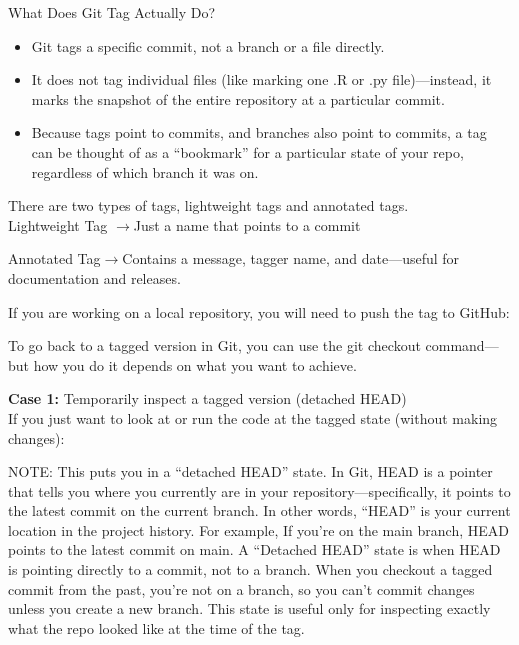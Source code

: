 \noindent What Does Git Tag Actually Do?
\begin{itemize}
\item Git tags a specific commit, not a branch or a file directly.
\item It does not tag individual files (like marking one .R or .py file)—instead, it marks the snapshot of the entire repository at a particular commit.
\item Because tags point to commits, and branches also point to commits, a tag can be thought of as a ``bookmark'' for a particular state of your repo, regardless of which branch it was on.
\end{itemize}

\noindent There are two types of tags, lightweight tags and annotated tags.\\
\noindent Lightweight Tag $\rightarrow$Just a name that points to a commit
\begin{terminal}
\end{terminal}

\noindent Annotated Tag$\rightarrow$Contains a message, tagger name, and date—useful for documentation and releases.
\begin{terminal}
\end{terminal}

\noindent If you are working on a local repository, you will need to push the tag to GitHub:
\begin{terminal}
\end{terminal}

\noindent To go back to a tagged version in Git, you can use the git checkout command---but how you do it depends on what you want to achieve. 

\noindent \textbf{Case 1:} Temporarily inspect a tagged version (detached HEAD)\\
\noindent If you just want to look at or run the code at the tagged state (without making changes):
\begin{terminal}
\end{terminal}
\noindent NOTE: This puts you in a ``detached HEAD'' state. In Git, HEAD is a pointer that tells you where you currently are in your repository---specifically, it points to the latest commit on the current branch. In other words, ``HEAD'' is your current location in the project history. For example, If you're on the main branch, HEAD points to the latest commit on main. A ``Detached HEAD'' state is when HEAD is pointing directly to a commit, not to a branch. When you checkout a tagged commit from the past, you’re not on a branch, so you can’t commit changes unless you create a new branch. This state is useful only for inspecting exactly what the repo looked like at the time of the tag.

